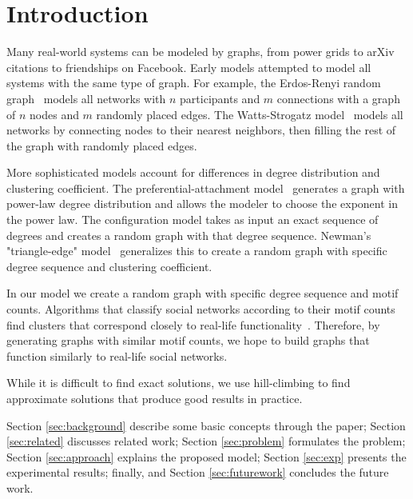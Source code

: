 \section{Introduction}
\label{sec:intro}

Many real-world systems can be modeled by graphs, from power grids to arXiv citations to friendships on Facebook.  Early models attempted to model all systems with the same type of graph.  For example, the Erdos-Renyi random graph~\cite{erdds1959random}\cite{erdos1960random} models all networks with $n$ participants and $m$ connections with a graph of $n$ nodes and $m$ randomly placed edges.  The Watts-Strogatz model~\cite{watts1998collective} models all networks by connecting nodes to their nearest neighbors, then filling the rest of the graph with randomly placed edges.

More sophisticated models account for differences in degree distribution and clustering coefficient.  The preferential-attachment model~\cite{albert2002statistical} generates a graph with power-law degree distribution and allows the modeler to choose the exponent in the power law.  The configuration model takes as input an exact sequence of degrees and creates a random graph with that degree sequence.  Newman's "triangle-edge" model~\cite{newman2009random} generalizes this to create a random graph with specific degree sequence and clustering coefficient.

In our model we create a random graph with specific degree sequence and motif counts.  Algorithms that classify social networks according to their motif counts find clusters that correspond closely to real-life functionality~\cite{chuanqi}.  Therefore, by generating graphs with similar motif counts, we hope to build graphs that function similarly to real-life social networks.

While it is difficult to find exact solutions, we use hill-climbing to find approximate solutions that produce good results in practice.

 Section \ref{sec:background} describe some basic concepts through the paper; Section \ref{sec:related} discusses related work; Section \ref{sec:problem} formulates the problem; Section \ref{sec:approach} explains the proposed model; Section \ref{sec:exp} presents the experimental results; finally,  and Section \ref{sec:futurework} concludes the future work.
